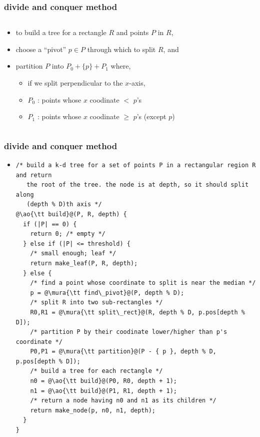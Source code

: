 \documentclass[12pt,dvipdfmx]{beamer}
\newcommand{\mura}[1]{{\color{purple}#1}}
\newcommand{\ao}[1]{{\color{blue}#1}}
\begin{document}
\begin{frame}
\frametitle{divide and conquer method}
\begin{columns}
\begin{column}{0.55\textwidth}
\begin{itemize}
\item<1-> to build a tree for a rectangle $R$ and points $P$ in $R$,
\item<2-> choose a ``pivot'' $p \in P$ through which to split $R$, and
\item<3-> partition $P$ into $P_0 + \{ p \} + P_1$ where,
  \begin{itemize}
  \item if we split perpendicular to the $x$-axis,
  \item $P_0$ : points whose $x$ coodinate $<$ $p$'s
  \item $P_1$ : points whose $x$ coodinate $\geq$ $p$'s (except $p$)
  \end{itemize}
\end{itemize}
\end{column}
  
\begin{column}{0.45\textwidth}
\begin{center}
\def\svgwidth{\columnwidth}
%
\only<2>{}%
\only<3>{}%
\end{center}
\end{column}
\end{columns}
\end{frame}

\begin{frame}[fragile]
\frametitle{divide and conquer method}
\begin{itemize}
\item []
\begin{lstlisting}
/* build a k-d tree for a set of points P in a rectangular region R and return 
   the root of the tree. the node is at depth, so it should split along 
   (depth % D)th axis */
@\ao{\tt build}@(P, R, depth) {
  if (|P| == 0) {
    return 0; /* empty */
  } else if (|P| <= threshold) {
    /* small enough; leaf */
    return make_leaf(P, R, depth);
  } else {
    /* find a point whose coordinate to split is near the median */
    p = @\mura{\tt find\_pivot}@(P, depth % D);
    /* split R into two sub-rectangles */
    R0,R1 = @\mura{\tt split\_rect}@(R, depth % D, p.pos[depth % D]);
    /* partition P by their coodinate lower/higher than p's coordinate */
    P0,P1 = @\mura{\tt partition}@(P - { p }, depth % D, p.pos[depth % D]);
    /* build a tree for each rectangle */
    n0 = @\ao{\tt build}@(P0, R0, depth + 1);
    n1 = @\ao{\tt build}@(P1, R1, depth + 1);
    /* return a node having n0 and n1 as its children */
    return make_node(p, n0, n1, depth);
  }
}
\end{lstlisting}
\end{itemize}
\end{frame}
\end{document}
